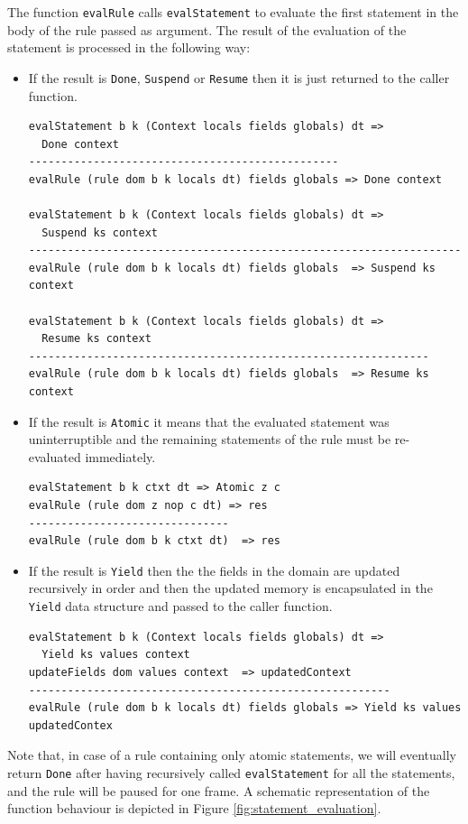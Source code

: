 The function \texttt{evalRule} calls \texttt{evalStatement} to evaluate the first statement in the body of the rule passed as argument. The result of the evaluation of the statement is processed in the following way:
\begin{itemize}
\item If the result is \texttt{Done}, \texttt{Suspend} or \texttt{Resume} then it is just returned to the caller function.
\begin{lstlisting}
evalStatement b k (Context locals fields globals) dt => 
  Done context
------------------------------------------------
evalRule (rule dom b k locals dt) fields globals => Done context

evalStatement b k (Context locals fields globals) dt => 
  Suspend ks context
-------------------------------------------------------------------
evalRule (rule dom b k locals dt) fields globals  => Suspend ks context

evalStatement b k (Context locals fields globals) dt => 
  Resume ks context
--------------------------------------------------------------
evalRule (rule dom b k locals dt) fields globals  => Resume ks context
\end{lstlisting}
\item If the result is \texttt{Atomic} it means that the evaluated statement was uninterruptible and the remaining statements of the rule must be re-evaluated immediately.
\begin{lstlisting}
evalStatement b k ctxt dt => Atomic z c
evalRule (rule dom z nop c dt) => res
-------------------------------
evalRule (rule dom b k ctxt dt)  => res
\end{lstlisting}
\item If the result is \texttt{Yield} then the the fields in the domain are updated recursively in order and then the updated memory is encapsulated in the \texttt{Yield} data structure and passed to the caller function.
\begin{lstlisting}
evalStatement b k (Context locals fields globals) dt => 
  Yield ks values context
updateFields dom values context  => updatedContext
--------------------------------------------------------
evalRule (rule dom b k locals dt) fields globals => Yield ks values updatedContex
\end{lstlisting}
\end{itemize}

Note that, in case of a rule containing only atomic statements, we will eventually return \texttt{Done} after having recursively called \texttt{evalStatement} for all the statements, and the rule will be paused for one frame. A schematic representation of the function behaviour is depicted in Figure \ref{fig:statement_evaluation}.

